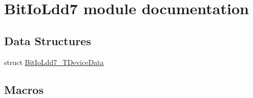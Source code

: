\hypertarget{group___bit_io_ldd7__module}{\section{Bit\-Io\-Ldd7 module documentation}
\label{group___bit_io_ldd7__module}
}
\subsection*{Data Structures}
\begin{DoxyCompactItemize}
\item 
struct \hyperlink{struct_bit_io_ldd7___t_device_data}{Bit\-Io\-Ldd7\-\_\-\-T\-Device\-Data}
\end{DoxyCompactItemize}
\subsection*{Macros}
